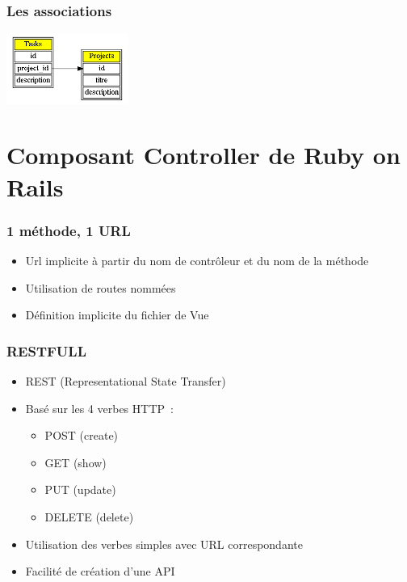 \documentclass{beamer}
\begin{document}
\begin{frame}
    \frametitle{Les associations}
    \begin{center}
        \includegraphics[width=40mm]{project_task.png}
        
    \end{center}
\end{frame}


\section{Composant Controller de Ruby on Rails}

\begin{frame}
    \frametitle{1 méthode, 1 URL}
    \begin{itemize}
        \item Url implicite à partir du nom de contr\^oleur et du nom de la
        méthode
        \item Utilisation de routes nommées
        \item Définition implicite du fichier de Vue
    \end{itemize}
\end{frame}

\begin{frame}
    \frametitle{RESTFULL}

    \begin{itemize}
        \item REST (Representational State Transfer)
        \item Basé sur les 4 verbes HTTP~:
            \begin{itemize}
                \item POST (create)
                \item GET (show)
                \item PUT (update)
                \item DELETE (delete)
            \end{itemize}
        \item Utilisation des verbes simples avec URL correspondante
        \item Facilité de création d'une API
    \end{itemize}
\end{frame}
\end{document}
